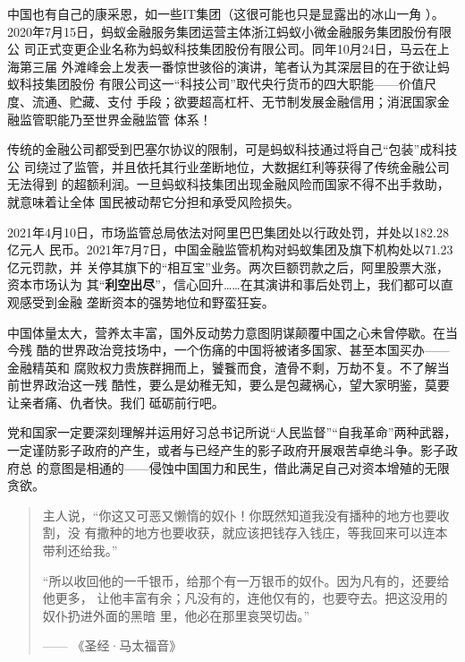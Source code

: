 中国也有自己的康采恩，如一些IT集团（这很可能也只是显露出的冰山一角
）。2020年7月15日，蚂蚁金融服务集团运营主体浙江蚂蚁小微金融服务集团股份有限公
司正式变更企业名称为蚂蚁科技集团股份有限公司。同年10月24日，马云在上海第三届
外滩峰会上发表一番惊世骇俗的演讲，笔者认为其深层目的在于欲让蚂蚁科技集团股份
有限公司这一“科技公司”取代央行货币的四大职能——价值尺度、流通、贮藏、支付
手段；欲要超高杠杆、无节制发展金融信用；消泯国家金融监管职能乃至世界金融监管
体系！

传统的金融公司都受到巴塞尔协议的限制，可是蚂蚁科技通过将自己“包装”成科技公
司绕过了监管，并且依托其行业垄断地位，大数据红利等获得了传统金融公司无法得到
的超额利润。一旦蚂蚁科技集团出现金融风险而国家不得不出手救助，就意味着让全体
国民被动帮它分担和承受风险损失。


2021年4月10日，市场监管总局依法对阿里巴巴集团处以行政处罚，并处以182.28亿元人
民币。2021年7月7日，中国金融监管机构对蚂蚁集团及旗下机构处以71.23亿元罚款，并
关停其旗下的“相互宝”业务。两次巨额罚款之后，阿里股票大涨，资本市场认为
其“\textbf{利空出尽}”，信心回升……在其演讲和事后处罚上，我们都可以直观感受到金融
垄断资本的强势地位和野蛮狂妄。


中国体量太大，营养太丰富，国外反动势力意图阴谋颠覆中国之心未曾停歇。在当今残
酷的世界政治竞技场中，一个伤痛的中国将被诸多国家、甚至本国买办——金融精英和
腐败权力贵族群拥而上，饕餮而食，渣骨不剩，万劫不复。不了解当前世界政治这一残
酷性，要么是幼稚无知，要么是包藏祸心，望大家明鉴，莫要让亲者痛、仇者快。我们
砥砺前行吧。

党和国家一定要深刻理解并运用好习总书记所说“人民监督”“自我革命”两种武器，
一定谨防影子政府的产生，或者与已经产生的影子政府开展艰苦卓绝斗争。影子政府总
的意图是相通的——侵蚀中国国力和民生，借此满足自己对资本增殖的无限贪欲。


\begin{quotation}
  主人说，“你这又可恶又懒惰的奴仆！你既然知道我没有播种的地方也要收割，没
  有撒种的地方也要收获，就应该把钱存入钱庄，等我回来可以连本带利还给我。”

  “所以收回他的一千银币，给那个有一万银币的奴仆。因为凡有的，还要给他更多，
  让他丰富有余；凡没有的，连他仅有的，也要夺去。把这没用的奴仆扔进外面的黑暗
  里，他必在那里哀哭切齿。”


  \raggedleft
  —— \quad《圣经·马太福音》 \qquad
\end{quotation}




